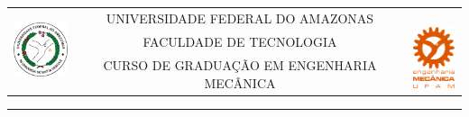 \begin{titlepage}

\hspace*{-0.1\textwidth}
\begin{tabular}{ccc}
\multirow{3}{*}{\includegraphics[height=1.8cm]{Imagens/brasaocor2.jpg}} & UNIVERSIDADE FEDERAL DO AMAZONAS & \multirow{3}{*}{\ \includegraphics[height=1.8cm]{Imagens/novo_logo_reduzido.png}} \\
 & FACULDADE DE TECNOLOGIA & \\
 & CURSO DE GRADUAÇÃO EM ENGENHARIA MECÂNICA & 
\end{tabular}
\hspace*{-0.05\textwidth}
\rule{15.5cm}{.02cm} \\
\begin{center}
\vspace{5cm}
\normalsize{\MakeUppercase{\AUTOR}}\\ 
\vspace{3.5cm}
\large{\textbf{\TITULO}}\\ %
\vfill%
\large{\LOCAL\\ \ANO}
\end{center}
\end{titlepage}


